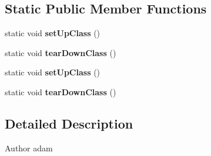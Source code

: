 \subsection*{Static Public Member Functions}
\begin{DoxyCompactItemize}
\item 
\hypertarget{class_c_a_s_u_a_l_1_1misc_1_1_boolean_operations_test_acd1a436a847b89427e4e266a4c45b213}{static void {\bfseries set\-Up\-Class} ()}\label{class_c_a_s_u_a_l_1_1misc_1_1_boolean_operations_test_acd1a436a847b89427e4e266a4c45b213}

\item 
\hypertarget{class_c_a_s_u_a_l_1_1misc_1_1_boolean_operations_test_a42471fc6118a8927fcf6c3534ba396de}{static void {\bfseries tear\-Down\-Class} ()}\label{class_c_a_s_u_a_l_1_1misc_1_1_boolean_operations_test_a42471fc6118a8927fcf6c3534ba396de}

\item 
\hypertarget{class_c_a_s_u_a_l_1_1misc_1_1_boolean_operations_test_acd1a436a847b89427e4e266a4c45b213}{static void {\bfseries set\-Up\-Class} ()}\label{class_c_a_s_u_a_l_1_1misc_1_1_boolean_operations_test_acd1a436a847b89427e4e266a4c45b213}

\item 
\hypertarget{class_c_a_s_u_a_l_1_1misc_1_1_boolean_operations_test_a42471fc6118a8927fcf6c3534ba396de}{static void {\bfseries tear\-Down\-Class} ()}\label{class_c_a_s_u_a_l_1_1misc_1_1_boolean_operations_test_a42471fc6118a8927fcf6c3534ba396de}

\end{DoxyCompactItemize}


\subsection{Detailed Description}
\begin{DoxyAuthor}{Author}
adam 
\end{DoxyAuthor}


